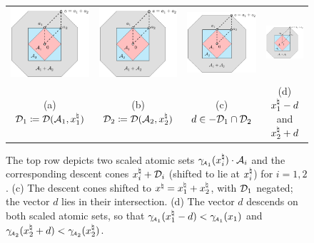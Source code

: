 \begin{figure}[t]
    \centering
    \begin{tabular}{@{}cccc@{}}
      \includegraphics[width=.24\textwidth, page=3]{./figures/illustrations2}
    & \includegraphics[width=.24\textwidth, page=4]{./figures/illustrations2}
    & \includegraphics[width=.24\textwidth, page=5]{./figures/illustrations2}
    & \includegraphics[width=.24\textwidth, page=6]{./figures/illustrations2}
  \\[6pt] \small (a) $\mathcal{D}_1\coloneqq\mathcal{D}(\mathcal{A}_1, x_1^{\natural})$ & (b) $\mathcal{D}_2\coloneqq\mathcal{D}(\mathcal{A}_2, x_2^{\natural})$ & (c) $d \in -\mathcal{D}_1\cap\mathcal{D}_2$ & (d) $x_1^{\natural} - d$ and $x_2^{\natural} + d$ 
    \end{tabular}
    \caption{The top row depicts two scaled atomic sets $\gamma_{\!\scriptscriptstyle\mathcal{A}_1}(x_i^{\natural})\cdot\mathcal{A}_i$ and the corresponding descent cones $x_i^{\natural} + \mathcal{D}_i$ (shifted to lie at $x_i^{\natural}$) for $i=1,2$. (c) The descent cones shifted to $x^{\natural} = x_1^{\natural} + x_2^{\natural}$, with $\mathcal{D}_1$ negated; the vector $d$ lies in their intersection. (d) The vector $d$ descends on both scaled atomic sets, so that $\gamma_{\!\scriptscriptstyle\mathcal{A}_1}(x_1^{\natural} - d) < \gamma_{\!\scriptscriptstyle\mathcal{A}_1}(x_1)$ and $\gamma_{\!\scriptscriptstyle\mathcal{A}_2}(x_2^{\natural} + d) < \gamma_{\!\scriptscriptstyle\mathcal{A}_2}(x_2^{\natural})$.}
    \label{fig:angle_cone}
  \end{figure}

